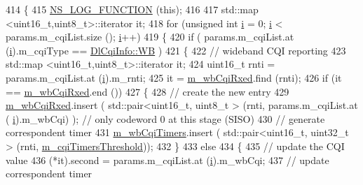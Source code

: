 \begin{DoxyCode}
414 \{
415   \hyperlink{log-macros-disabled_8h_a90b90d5bad1f39cb1b64923ea94c0761}{NS\_LOG\_FUNCTION} (\textcolor{keyword}{this});
416 
417   std::map <uint16\_t,uint8\_t>::iterator it;
418   \textcolor{keywordflow}{for} (\textcolor{keywordtype}{unsigned} \textcolor{keywordtype}{int} \hyperlink{bernuolliDistribution_8m_a6f6ccfcf58b31cb6412107d9d5281426}{i} = 0; \hyperlink{bernuolliDistribution_8m_a6f6ccfcf58b31cb6412107d9d5281426}{i} < params.m\_cqiList.size (); \hyperlink{bernuolliDistribution_8m_a6f6ccfcf58b31cb6412107d9d5281426}{i}++)
419     \{
420       \textcolor{keywordflow}{if} ( params.m\_cqiList.at (\hyperlink{bernuolliDistribution_8m_a6f6ccfcf58b31cb6412107d9d5281426}{i}).m\_cqiType == \hyperlink{structns3_1_1DlCqiInfo_a58a9fff4b49e4a8df1fdea1005c4735caa1097f844b06ac6dbdbac42802ba2403}{DlCqiInfo::WB} )
421         \{
422           \textcolor{comment}{// wideband CQI reporting}
423           std::map <uint16\_t,uint8\_t>::iterator it;
424           uint16\_t rnti = params.m\_cqiList.at (\hyperlink{bernuolliDistribution_8m_a6f6ccfcf58b31cb6412107d9d5281426}{i}).m\_rnti;
425           it = \hyperlink{classns3_1_1MmWaveFlexTtiMaxWeightMacScheduler_a46c51259ff3607f3ef2f4684485f274c}{m\_wbCqiRxed}.find (rnti);
426           \textcolor{keywordflow}{if} (it == \hyperlink{classns3_1_1MmWaveFlexTtiMaxWeightMacScheduler_a46c51259ff3607f3ef2f4684485f274c}{m\_wbCqiRxed}.end ())
427             \{
428               \textcolor{comment}{// create the new entry}
429               \hyperlink{classns3_1_1MmWaveFlexTtiMaxWeightMacScheduler_a46c51259ff3607f3ef2f4684485f274c}{m\_wbCqiRxed}.insert ( std::pair<uint16\_t, uint8\_t > (rnti, params.m\_cqiList.at (
      \hyperlink{bernuolliDistribution_8m_a6f6ccfcf58b31cb6412107d9d5281426}{i}).m\_wbCqi) ); \textcolor{comment}{// only codeword 0 at this stage (SISO)}
430               \textcolor{comment}{// generate correspondent timer}
431               \hyperlink{classns3_1_1MmWaveFlexTtiMaxWeightMacScheduler_ae5d8e61af9fd27ffd79a17f068267f42}{m\_wbCqiTimers}.insert ( std::pair<uint16\_t, uint32\_t > (rnti, 
      \hyperlink{classns3_1_1MmWaveFlexTtiMaxWeightMacScheduler_a12853e0079042ba54793594532d1ef15}{m\_cqiTimersThreshold}));
432             \}
433           \textcolor{keywordflow}{else}
434             \{
435               \textcolor{comment}{// update the CQI value}
436               (*it).second = params.m\_cqiList.at (\hyperlink{bernuolliDistribution_8m_a6f6ccfcf58b31cb6412107d9d5281426}{i}).m\_wbCqi;
437               \textcolor{comment}{// update correspondent timer}

\end{DoxyCode}
